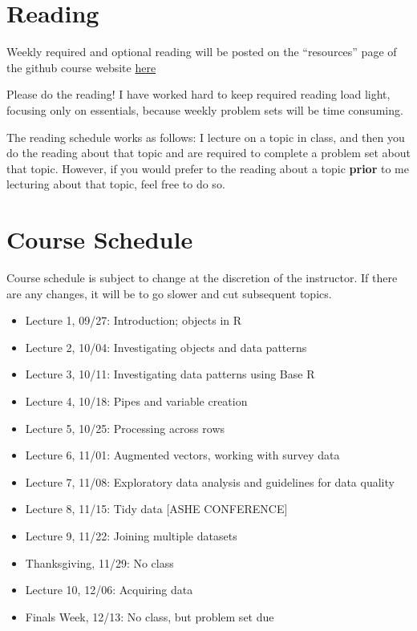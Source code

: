 \documentclass[11pt,]{article}
\begin{document}
\section{Reading}\label{reading}

Weekly required and optional reading will be posted on the ``resources''
page of the github course website
\href{https://ozanj.github.io/rclass/resources/}{here}

Please do the reading! I have worked hard to keep required reading load
light, focusing only on essentials, because weekly problem sets will be
time consuming.

The reading schedule works as follows: I lecture on a topic in class,
and then you do the reading about that topic and are required to
complete a problem set about that topic. However, if you would prefer to
the reading about a topic \textbf{prior} to me lecturing about that
topic, feel free to do so.

\section{Course Schedule}\label{course-schedule}

Course schedule is subject to change at the discretion of the
instructor. If there are any changes, it will be to go slower and cut
subsequent topics.

\begin{itemize}
\item
  Lecture 1, 09/27: Introduction; objects in R
\item
  Lecture 2, 10/04: Investigating objects and data patterns
\item
  Lecture 3, 10/11: Investigating data patterns using Base R
\item
  Lecture 4, 10/18: Pipes and variable creation
\item
  Lecture 5, 10/25: Processing across rows
\item
  Lecture 6, 11/01: Augmented vectors, working with survey data
\item
  Lecture 7, 11/08: Exploratory data analysis and guidelines for data
  quality
\item
  Lecture 8, 11/15: Tidy data {[}ASHE CONFERENCE{]}
\item
  Lecture 9, 11/22: Joining multiple datasets
\item
  Thanksgiving, 11/29: No class
\item
  Lecture 10, 12/06: Acquiring data
\item
  Finals Week, 12/13: No class, but problem set due
\end{itemize}
\end{document}
